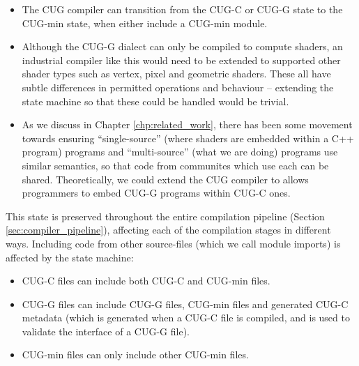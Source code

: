 \documentclass[a4paper,12pt,twoside,openright]{report}
\begin{document}
\begin{itemize}

    \item The CUG compiler can transition from the CUG-C or CUG-G state to the
    CUG-min state, when either include a CUG-min module.

    \item Although the CUG-G dialect can only be compiled to compute shaders,
    an industrial compiler like this would need to be extended to supported
    other shader types such as vertex, pixel and geometric shaders. These all
    have subtle differences in permitted operations and behaviour -- extending
    the state machine so that these could be handled would be trivial.

    \item As we discuss in Chapter \ref{chp:related_work}, there has been some
    movement towards ensuring ``single-source'' (where shaders are embedded
    within a C++ program) programs and ``multi-source'' (what we are doing)
    programs use similar semantics, so that code from communites which use each
    can be shared. Theoretically, we could extend the CUG compiler to allows
    programmers to embed CUG-G programs within CUG-C ones.

\end{itemize}

This state is preserved throughout the entire compilation pipeline (Section
\ref{sec:compiler_pipeline}), affecting each of the compilation stages in
different ways. Including code from other source-files (which we call module
imports) is affected by the state machine:

\begin{itemize}

    \item CUG-C files can include both CUG-C and CUG-min files.

    \item CUG-G files can include CUG-G files, CUG-min files and generated
    CUG-C metadata (which is generated when a CUG-C file is compiled, and is
    used to validate the interface of a CUG-G file).

    \item CUG-min files can only include other CUG-min files.

\end{itemize}

\end{document}
